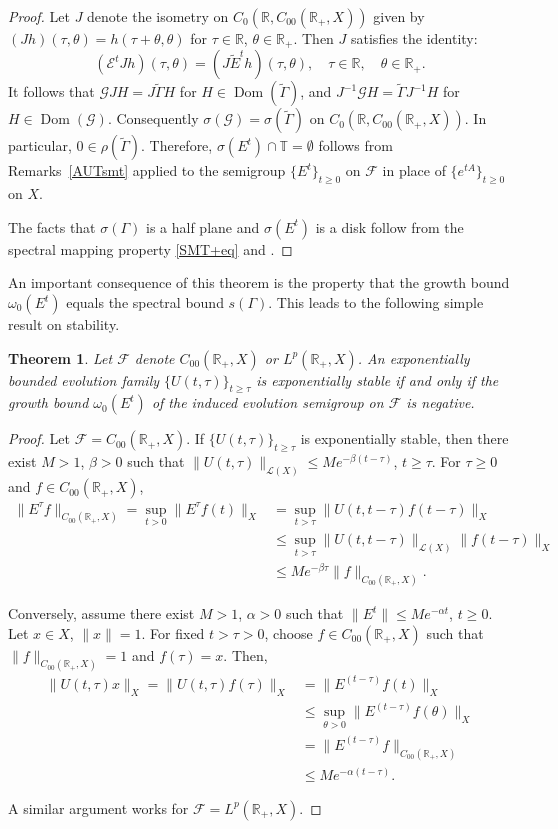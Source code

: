 \documentclass[10pt,psamsfonts,leqno]{siamltex}
\newtheorem{thm}[prop]{Theorem}
\newcommand{\bbR}{\mathbb{R}}
\newcommand{\bbT}{\mathbb{T}}
\newcommand{\Dom}{\operatorname{Dom}}
\renewcommand{\t}{\tau}
\newcommand{\lb}{\label}
\newcommand{\Coo}{{C_{00}(\bbR_+,X)}}
\newcommand{\LpRp}{{L^p(\bbR_+,X)}}
\begin{document}
\begin{proof}
Let $J$ denote the isometry on $C_0(\bbR,C_{00}(\bbR_+,X))$
given by $(J h)(\tau ,\theta )=h(\tau+\theta ,\theta )$ for $\tau \in
\bbR$, $\theta\in\bbR_+$.  Then $J$ satisfies the identity:
$$
(\mathcal{E}^tJh)(\tau,\theta)=
(J\tilde{E}^th)(\tau,\theta),\quad \tau \in \bbR,\quad
\theta \in \bbR_+.
$$
It follows that
$\mathcal{G}JH=J\tilde{\Gamma }H$ for
$H\in \Dom(\tilde{\Gamma })$, and
$J^{-1}\mathcal{G}H=\tilde{\Gamma }J^{-1}H$ for
$H\in \Dom(\mathcal{G})$.  Consequently
$\sigma (\mathcal{G})=\sigma (\tilde{\Gamma })$
on $C_0(\bbR,C_{00}(\bbR_+,X))$. In particular, $0\in \rho
(\tilde{\Gamma })$.  Therefore,
$\sigma (E^t)\cap \bbT=\emptyset$ follows from Remarks~\ref{AUTsmt}
applied to the semigroup $\{E^t\}_{t\ge0}$ on $\mathcal{F}$ in place of
$\{e^{tA}\}_{t\ge0}$ on $X$.

The facts that  $\sigma(\Gamma)$ is a half plane and
$\sigma(E^t)$ is a disk follow from the spectral mapping property
\eqref{SMT+eq} and \cite[Proposition 2]{Rau}.
\end{proof}

An important consequence of this theorem is the property that the growth
bound
$\omega_0(E^t)$ equals the spectral bound $s(\Gamma)$.  This leads to
the following simple result on stability.

\begin{thm}\lb{ExpStabThm+} Let $\mathcal{F}$ denote $C_{00}(\bbR_+,X)$
or $\LpRp$.  An exponentially bounded evolution family
$\{U(t,\tau)\}_{t\ge\tau}$ is exponentially stable if and only if the
growth bound
$\omega_0(E^t)$ of the induced evolution semigroup on $\mathcal{F}$
is negative.
\end{thm}

\begin{proof}  Let $\mathcal{F}=\Coo$.  If $\{U(t,\tau)\}_{t\ge\tau}$ is
exponentially stable, then there exist $M>1$,
$\beta>0$ such that $\|U(t,\tau)\|_{\mathcal{L}(X)}
\le Me^{-\beta(t-\tau)}$, $t\ge
\tau$. For $\t\ge0$ and $f\in\Coo$,
$$
\begin{aligned} \|E^\tau f\|_{\Coo} = \sup_{t>0}\|E^\tau f(t)\|_X
&=\sup_{t>\tau}\|U(t,t-\tau)f(t-\t)\|_X \\
&\le\sup_{t>\tau}\|U(t,t-\tau)\|_{\mathcal{L}(X)} \|f(t-\tau)\|_X \\
&\le Me^{-\beta \tau} \|f\|_{\Coo}.
\end{aligned}
$$

Conversely, assume there exist $M>1$, $\alpha>0$ such that
$\|E^t\|\le Me^{-\alpha t}$, $t\ge 0$.  Let $x\in X$,
$\|x\|=1$.  For fixed $t> \tau > 0$, choose $f\in\Coo$ such that
$\|f\|_{\Coo}=1$ and $f(\tau)=x$.  Then,
$$
\begin{aligned}
\|U(t,\tau )x\|_X=\|U(t,\tau )f(\tau )\|_X &=\|E^{(t-\tau )}f(t)\|_X \\
&\le\sup_{\theta>0}\|E^{(t-\tau)}f(\theta)\|_X\\
&=\|E^{(t-\tau)}f\|_{\Coo}\\
&\le Me^{-\alpha(t-\tau)}.
\end{aligned}
$$

A similar argument works for $\mathcal{F}=\LpRp$.
\end{proof}
\end{document}
